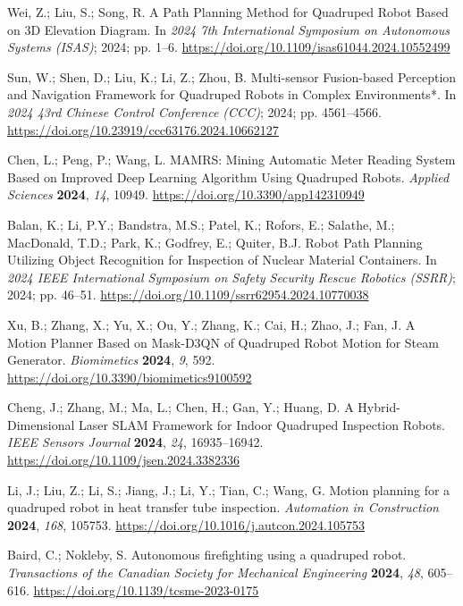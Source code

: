 Wei, Z.; Liu, S.; Song, R. A Path Planning Method for Quadruped Robot Based on 3D Elevation Diagram. In \emph{2024 7th International Symposium on Autonomous Systems (ISAS)}; 2024; pp. 1--6. \url{https://doi.org/10.1109/isas61044.2024.10552499}

Sun, W.; Shen, D.; Liu, K.; Li, Z.; Zhou, B. Multi-sensor Fusion-based Perception and Navigation Framework for Quadruped Robots in Complex Environments*. In \emph{2024 43rd Chinese Control Conference (CCC)}; 2024; pp. 4561--4566. \url{https://doi.org/10.23919/ccc63176.2024.10662127}

Chen, L.; Peng, P.; Wang, L. MAMRS: Mining Automatic Meter Reading System Based on Improved Deep Learning Algorithm Using Quadruped Robots. \emph{Applied Sciences} \textbf{2024}, \emph{14}, 10949. \url{https://doi.org/10.3390/app142310949}

Balan, K.; Li, P.Y.; Bandstra, M.S.; Patel, K.; Rofors, E.; Salathe, M.; MacDonald, T.D.; Park, K.; Godfrey, E.; Quiter, B.J. Robot Path Planning Utilizing Object Recognition for Inspection of Nuclear Material Containers. In \emph{2024 IEEE International Symposium on Safety Security Rescue Robotics (SSRR)}; 2024; pp. 46--51. \url{https://doi.org/10.1109/ssrr62954.2024.10770038}

Xu, B.; Zhang, X.; Yu, X.; Ou, Y.; Zhang, K.; Cai, H.; Zhao, J.; Fan, J. A Motion Planner Based on Mask-D3QN of Quadruped Robot Motion for Steam Generator. \emph{Biomimetics} \textbf{2024}, \emph{9}, 592. \url{https://doi.org/10.3390/biomimetics9100592}

Cheng, J.; Zhang, M.; Ma, L.; Chen, H.; Gan, Y.; Huang, D. A Hybrid-Dimensional Laser SLAM Framework for Indoor Quadruped Inspection Robots. \emph{IEEE Sensors Journal} \textbf{2024}, \emph{24}, 16935--16942. \url{https://doi.org/10.1109/jsen.2024.3382336}

Li, J.; Liu, Z.; Li, S.; Jiang, J.; Li, Y.; Tian, C.; Wang, G. Motion planning for a quadruped robot in heat transfer tube inspection. \emph{Automation in Construction} \textbf{2024}, \emph{168}, 105753. \url{https://doi.org/10.1016/j.autcon.2024.105753}

Baird, C.; Nokleby, S. Autonomous firefighting using a quadruped robot. \emph{Transactions of the Canadian Society for Mechanical Engineering} \textbf{2024}, \emph{48}, 605--616. \url{https://doi.org/10.1139/tcsme-2023-0175}

